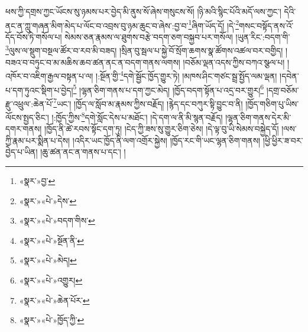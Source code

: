 ཕས་ཀྱི་དགྲས་ཀྱང་ཡོངས་སུ་ཉམས་པར་བྱེད་མི་ནུས་སོ་ཞེས་གསུངས་སོ། །ཉི་མའི་སྙིང་པོའི་མདོ་ལས་ཀྱང་། དེའི་ནང་ན་ཀླུ་གཞན་མིག་མེད་པ་ལོང་བ་འབྲས་བུ་ཉམ་ཆུང་བ་ཞེས་:བྱ་བ་\footnote{«སྣར་»བྱ་}ཞིག་ཡོད་དོ། །དེ་\footnote{«སྣར་»«པེ་»དེས་}གསང་བསྟོད་ནས་འོ་དོད་བོས་ཏེ་གསོལ་པ། སེམས་ཅན་རྣམས་ལ་ཐུགས་བརྩེ་བདག་ཅག་བསྐྱབ་པར་གསོལ། །ཡུན་རིང་:བདག་གི་\footnote{«སྣར་»«པེ་»བདག་གིས་}ལུས་ལ་སྡུག་བསྔལ་ཚོར་བ་རབ་མི་བཟད། །སྲིན་བུ་སྦལ་པ་སྐྱེ་བོ་སྲོག་ཆགས་སྣ་ཚོགས་འཚལ་བར་བགྱིད། །བཟའ་བ་བཏུང་བ་མ་མཆིས་ཆབ་ཚན་ནང་ན་བདག་གནས་ལགས། །བཅོམ་ལྡན་འདས་ཀྱིས་བཀའ་སྩལ་པ། །འཁོར་བ་འཇིག་རྒྱལ་བསྟན་པ་ལ། །:སྔོན་གྱི་\footnote{«སྣར་»«པེ་»སྔོན་ནི་}དགེ་སྦྱོང་ཁྱོད་གྱུར་ཏེ། །མཁས་ཤིང་གཙང་སྦྲ་སྤྱོད་ལམ་ལྡན། །དབེན་པ་དག་ཏུའང་སྡིག་པ་བྱེད།\footnote{«སྣར་»«པེ་»མེད།} །ལྷན་ཅིག་གནས་པ་དག་ཀྱང་མེད། །ཁྱོད་བདག་སྟོན་པ་འདྲ་བར་གྱུར།\footnote{«སྣར་»«པེ་»འགྱུར།} །དགྲ་བཅོམ་རྫུ་འཕྲུལ་:ཆེན་པོ་\footnote{«སྣར་»«པེ་»ཆེན་པོར་}ཡང་། །ཁྱོད་ལ་སློབ་མ་རྣམས་ཀྱིས་བརྗོད། །རྙེད་དང་བཀུར་སྟི་བྱུང་བ་ནི། །ཁྱོད་གཅིག་པུ་ཡིས་ལོངས་སྤྱད་ཅིང་། །:ཁྱོད་ཀྱིས་\footnote{«སྣར་»«པེ་»ཁྱོད་ཀྱི་}དགེ་སློང་དེས་པ་མཐོང་། །དེ་དག་ལ་ནི་མི་སྙན་བརྗོད། །ལྷན་ཅིག་གནས་དེར་མི་དགར་གནས། །ཁྱོད་ནི་ཚེ་རབས་སྟོང་དག་ཏུ། །ངེད་ཀྱི་ཟས་སུ་གྱུར་ཅིག་ཅེས། །དེ་ལྟ་བུ་ཡི་སེམས་བསྐྱེད་དོ། །ལས་ཀྱི་རྣམ་པར་སྨིན་པ་དེས། །འདིར་ཡང་ཁྱོད་ནི་ལག་འགྲོར་སྐྱེས། །ཁྱོད་རང་གི་ཡང་ལྷན་ཅིག་གནས། །ཕྱི་ཕྱིར་ཟ་བར་བྱེད་པ་ཡིན། །ཆུ་ཚན་ནང་ན་གནས་པ་དང་། །
